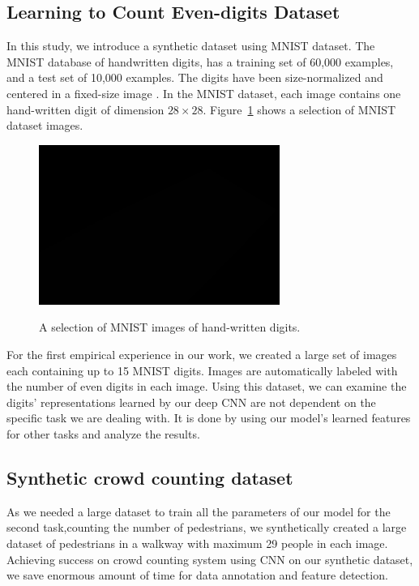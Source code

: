 \subsection{Learning to Count Even-digits Dataset}

In this study, we introduce a synthetic dataset using MNIST dataset. The MNIST database of handwritten digits, has a training set of 60,000 examples, and a test set of 10,000 examples. The digits have been size-normalized and centered in a fixed-size image \cite{lecun1999mnist}. In the MNIST dataset, each image contains one hand-written digit of dimension $28\times28$. Figure~\ref{fig:mnistimages} shows a selection of MNIST dataset images.

\begin{figure}[H]
	\centering
	{\includegraphics[width=0.7\textwidth]{images/1}}
	\caption{A selection of MNIST images of hand-written digits.}
	\label{fig:mnistimages}
\end{figure}


\noindent For the first empirical experience in our work, we created a large set of images each containing up to 15 MNIST digits. Images are automatically labeled with the number of even digits in each image. Using this dataset, we can examine the digits' representations learned by our deep CNN are not dependent on the specific task we are dealing with. It is done by using our model's learned features for other tasks and analyze the results. 

\subsection{Synthetic crowd counting dataset}

As we needed a large dataset to train all the parameters of our model for the second task,counting the number of pedestrians, we synthetically created a large dataset of pedestrians in a walkway with maximum 29 people in each image. Achieving success on crowd counting system using CNN on our synthetic dataset, we save enormous amount of time for data annotation and feature detection. 

